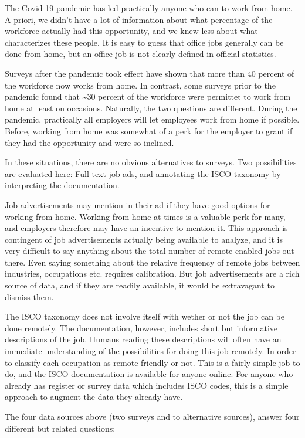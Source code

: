 \documentclass[11pt,]{article}
\begin{document}
The Covid-19 pandemic has led practically anyone who can to work from
home. A priori, we didn't have a lot of information about what
percentage of the workforce actually had this opportunity, and we knew
less about what characterizes these people. It is easy to guess that
office jobs generally can be done from home, but an office job is not
clearly defined in official statistics.

Surveys after the pandemic took effect have shown that more than 40
percent of the workforce now works from home. In contrast, some surveys
prior to the pandemic found that \textasciitilde{}30 percent of the
workforce were permittet to work from home at least on occasions.
Naturally, the two questions are different. During the pandemic,
practically all employers will let employees work from home if possible.
Before, working from home was somewhat of a perk for the employer to
grant if they had the opportunity and were so inclined.

In these situations, there are no obvious alternatives to surveys. Two
possibilities are evaluated here: Full text job ads, and annotating the
ISCO taxonomy by interpreting the documentation.

Job advertisements may mention in their ad if they have good options for
working from home. Working from home at times is a valuable perk for
many, and employers therefore may have an incentive to mention it. This
approach is contingent of job advertisements actually being available to
analyze, and it is very difficult to say anything about the total number
of remote-enabled jobs out there. Even saying something about the
relative frequency of remote jobs between industries, occupations etc.
requires calibration. But job advertisements are a rich source of data,
and if they are readily available, it would be extravagant to dismiss
them.

The ISCO taxonomy does not involve itself with wether or not the job can
be done remotely. The documentation, however, includes short but
informative descriptions of the job. Humans reading these descriptions
will often have an immediate understanding of the possibilities for
doing this job remotely. In order to classify each occupation as
remote-friendly or not. This is a fairly simple job to do, and the ISCO
documentation is available for anyone online. For anyone who already has
register or survey data which includes ISCO codes, this is a simple
approach to augment the data they already have.

The four data sources above (two surveys and to alternative sources),
answer four different but related questions:
\end{document}
